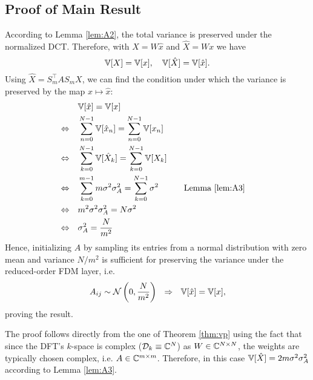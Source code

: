 \subsection{Proof of Main Result}

%
\proof
    According to Lemma \ref{lem:A2}, the total variance is preserved under the normalized DCT. Therefore, with $X = W\hat x$ and $\hat X = Wx$ we have
    \[
        \mathbb{V}[X] = \mathbb{V}[x], \quad \mathbb{V}[\hat X] = \mathbb{V}[\hat x].
    \]
    Using $\hat X = S_m^\top A S_m X$, we can find the condition under which the variance is preserved by the map $x\mapsto \hat x$:
    \[
        \begin{aligned}
                             & \mathbb{V}[\hat x] =  \mathbb{V}[x]\\
        \Leftrightarrow\quad & \sum_{n=0}^{N-1} \mathbb{V}[\hat x_n] = \sum_{n=0}^{N-1} \mathbb{V}[x_n]\\
        \Leftrightarrow\quad & \sum_{k=0}^{N-1} \mathbb{V}[\hat X_k] = \sum_{k=0}^{N-1} \mathbb{V}[X_k]\\
        \Leftrightarrow\quad & \sum_{k=0}^{m-1} m\sigma^2\sigma^2_A = \sum_{k=0}^{N-1} \sigma^2&&\quad \text{Lemma \ref{lem:A3}}\\
        \Leftrightarrow\quad & m^2\sigma^2\sigma^2_A =  N \sigma^2 \\
        \Leftrightarrow\quad & \sigma^2_A =  \frac{N}{m^2}
        \end{aligned}
    \]
    Hence, initializing $A$ by sampling its entries from a normal distribution with zero mean and variance $N/m^2$ is sufficient for preserving the variance under the reduced-order FDM layer, i.e.
    \[
        A_{ij} \sim \mathcal{N}\left(0, \frac{N}{m^2}\right)~~\Rightarrow~~\mathbb{V}[\hat x] = \mathbb{V}[x],
    \]
    proving the result.
\endproof

\vpdft*
%
\proof
    The proof follows directly from the one of Theorem \ref{thm:vp} using the fact that since the DFT's $k$-space is complex ($\mathcal{D}_k\equiv\mathbb{C}^N$) as $W\in\mathbb{C}^{N\times N}$, the weights are typically chosen complex, i.e. $A\in\mathbb{C}^{m\times m}$. Therefore, in this case $\mathbb{V}[\hat X] = 2m\sigma^2\sigma_A^2$ according to Lemma \ref{lem:A3}.
\endproof


